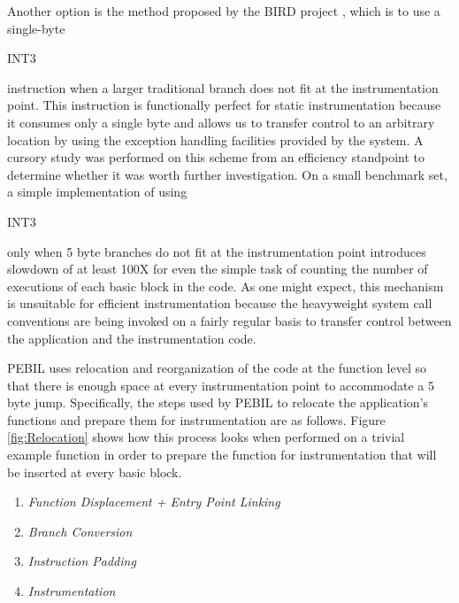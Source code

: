 Another option is the method proposed by the BIRD project \cite{nanda2006bird}, which
is to use a single-byte \begin{it}INT3\end{it} instruction when a larger traditional
branch does not fit at the instrumentation point. This instruction is functionally
perfect for static instrumentation because it consumes only a single byte and
allows us to transfer control to an arbitrary location by using the exception handling
facilities provided by the system. A cursory study was performed on this scheme
from an efficiency standpoint to determine whether it was worth further
investigation. On a small benchmark set, a simple implementation of using
\begin{it}INT3\end{it} only when 5 byte branches do not fit at
the instrumentation point introduces slowdown of at least 100X for
even the simple task of counting the number of executions of each basic block in the code. As one might
expect, this mechanism is unsuitable for efficient instrumentation because the
heavyweight system call conventions are being invoked on a fairly regular basis to
transfer control between the application and the instrumentation code.

PEBIL uses relocation and reorganization of the code at the function level so that
there is enough space at every instrumentation point to accommodate a 5 byte
jump. Specifically, the steps used by PEBIL to relocate the application's functions and prepare them
for instrumentation are as follows. Figure \ref{fig:Relocation} shows how this process looks when performed on 
a trivial example function in order to prepare the function for instrumentation
that will be inserted at every basic block.

\begin{enumerate}
 \item \textit{Function Displacement + Entry Point Linking}
 \item \textit{Branch Conversion}
 \item \textit{Instruction Padding}
 \item \textit{Instrumentation}
\end{enumerate}

